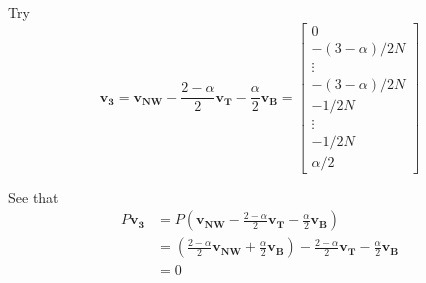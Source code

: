 \documentclass[11pt]{article}
\begin{document}
Try
\begin{equation}
\mathbf{v_3} = \mathbf{v_{NW}} - \frac{2-\alpha}{2}\mathbf{v_T} -\frac{\alpha}{2}\mathbf{v_B} = \left[\begin{array}{c}
0 \\ -(3-\alpha)/2N\\ \vdots \\ -(3-\alpha)/2N \\ -1/2N \\ \vdots \\ -1/2N \\ \alpha/2
\end{array}\right]
\end{equation}

See that
\begin{align}
P\mathbf{v_3} &= P\left(\mathbf{v_{NW}} - \frac{2-\alpha}{2}\mathbf{v_T} -\frac{\alpha}{2}\mathbf{v_B}\right)\\
&=\left(\frac{2-\alpha}{2}\mathbf{v_{NW}} + \frac{\alpha}{2}\mathbf{v_B}\right) - \frac{2-\alpha}{2}\mathbf{v_T} - \frac{\alpha}{2}\mathbf{v_B}\\
&=0
\end{align}
\end{document}
